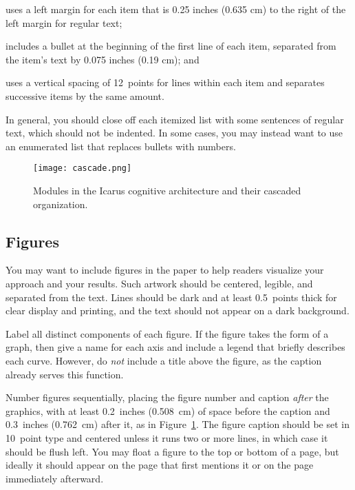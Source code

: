 \documentclass[11pt,letterpaper]{article}
\begin{document}
\cbullet 
uses a left margin for each item that is 0.25 inches (0.635 cm) to the 
right of the left margin for regular text; 

\cbullet 
includes a bullet at the beginning of the first line of each item,
separated from the item's text by 0.075 inches (0.19 cm); and

\cbullet 
uses a vertical spacing of 12~points for lines within each item 
and separates successive items by the same amount. 

\vskip 0.05in
\noindent
In general, you should close off each itemized list with some sentences 
of regular text, which should not be indented. In some cases, you may
instead want to use an enumerated list that replaces bullets with numbers. 

\begin{figure}[t]
\vskip 0.05in
\begin{center}
\texttt{[image: cascade.png]}
\caption{Modules in the {\sc Icarus} cognitive architecture and their
         cascaded organization.} 
\label{sample-figure}
\end{center}
\vskip -0.2in
\end{figure} 

\subsection{Figures}
 
You may want to include figures in the paper to help readers visualize
your approach and your results. Such artwork should be centered,
legible, and separated from the text. Lines should be dark and at
least 0.5~points thick for clear display and printing, and the text 
should not appear on a dark background.



Label all distinct components of each figure. If the figure takes
the form of a graph, then give a name for each axis and include a 
legend that briefly describes each curve. However, do {\it not\/} 
include a title above the figure, as the caption already serves
this function. 

Number figures sequentially, placing the figure number and caption
{\it after\/} the graphics, with at least 0.2~inches (0.508~cm) of 
space before the caption and 0.3~inches (0.762~cm) after it, as in
Figure~\ref{sample-figure}. The figure caption should be set in
10~point type and centered unless it runs two or more lines, in which
case it should be flush left. You may float a figure to the top or
bottom of a page, but ideally it should appear on the page that
first mentions it or on the page immediately afterward. 
 
\end{document}
